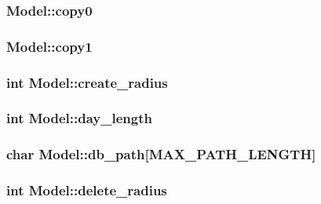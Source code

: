 \subsubsection[{\texorpdfstring{copy0}{copy0}}]{ Model\+::copy0}\hypertarget{structModel_a3ddb16326999cefcf195fdd796d411a4}{}\label{structModel_a3ddb16326999cefcf195fdd796d411a4}
\subsubsection[{\texorpdfstring{copy1}{copy1}}]{ Model\+::copy1}\hypertarget{structModel_a80358faa79d27e0e905f6542044458c5}{}\label{structModel_a80358faa79d27e0e905f6542044458c5}
\subsubsection[{\texorpdfstring{create\+\_\+radius}{create_radius}}]{\setlength{\rightskip}{0pt plus 5cm}int Model\+::create\+\_\+radius}\hypertarget{structModel_ab285f5b424f0989de991724b7842f7ee}{}\label{structModel_ab285f5b424f0989de991724b7842f7ee}
\subsubsection[{\texorpdfstring{day\+\_\+length}{day_length}}]{\setlength{\rightskip}{0pt plus 5cm}int Model\+::day\+\_\+length}\hypertarget{structModel_afd79a77cf19803921e2c10984ec9af52}{}\label{structModel_afd79a77cf19803921e2c10984ec9af52}
\subsubsection[{\texorpdfstring{db\+\_\+path}{db_path}}]{\setlength{\rightskip}{0pt plus 5cm}char Model\+::db\+\_\+path\mbox{[}{\bf M\+A\+X\+\_\+\+P\+A\+T\+H\+\_\+\+L\+E\+N\+G\+TH}\mbox{]}}\hypertarget{structModel_af802d2f02b947ba1772707eb247f8dac}{}\label{structModel_af802d2f02b947ba1772707eb247f8dac}
\subsubsection[{\texorpdfstring{delete\+\_\+radius}{delete_radius}}]{\setlength{\rightskip}{0pt plus 5cm}int Model\+::delete\+\_\+radius}\hypertarget{structModel_a424db0f8c4b9225fc177664d0564b9f6}{}\label{structModel_a424db0f8c4b9225fc177664d0564b9f6}
